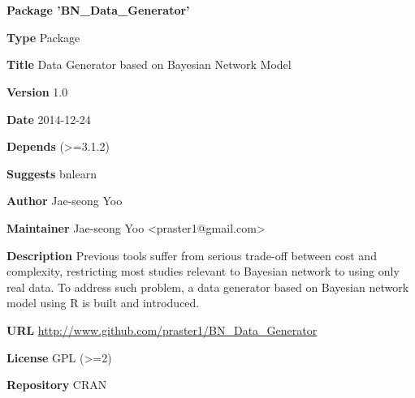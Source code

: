 \documentclass[letterpaper]{book}
\begin{document}
\chapter*{}
\begin{center}
{\textbf{\huge Package 'BN\_Data\_Generator'}}
\par\bigskip{\large \today}
\end{center}

{\textbf{Type} Package}

{\textbf{Title} Data Generator based on Bayesian Network Model}

{\textbf{Version} 1.0}

{\textbf{Date} 2014-12-24}

{\textbf{Depends} \R{} (>=3.1.2)}

{\textbf{Suggests} bnlearn}

{\textbf{Author} Jae-seong Yoo}

{\textbf{Maintainer} Jae-seong Yoo <praster1@gmail.com>}

{\textbf{Description} Previous tools suffer from serious trade-off between cost and complexity, restricting most studies relevant to Bayesian network to using only real data. To address such problem, a data generator based on Bayesian network model using R is built and introduced.}

{\textbf{URL} \url{http://www.github.com/praster1/BN\_Data\_Generator}}

{\textbf{License} GPL (>=2)}

{\textbf{Repository} CRAN}
\end{document}
